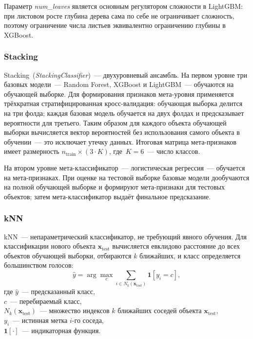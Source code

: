 Параметр \textit{num\_leaves} является основным регулятором сложности в LightGBM: при листовом росте глубина дерева сама по себе не ограничивает сложность, поэтому ограничение числа листьев эквивалентно ограничению глубины в XGBoost.

\subsubsection{Stacking}

Stacking~(\textit{StackingClassifier})~--- двухуровневый ансамбль. На первом уровне три базовых модели~--- Random Forest, XGBoost и LightGBM~--- обучаются на обучающей выборке. Для формирования признаков мета-уровня применяется трёхкратная стратифицированная кросс-валидация: обучающая выборка делится на три фолда; каждая базовая модель обучается на двух фолдах и предсказывает вероятности для третьего. Таким образом для каждого объекта обучающей выборки вычисляется вектор вероятностей без использования самого объекта в обучении~--- это исключает утечку данных. Итоговая матрица мета-признаков имеет размерность $n_{\text{train}} \times (3 \cdot K)$, где~$K = 6$~--- число классов.

На втором уровне мета-классификатор~--- логистическая регрессия~--- обучается на мета-признаках. При оценке на тестовой выборке базовые модели дообучаются на полной обучающей выборке и формируют мета-признаки для тестовых объектов; затем мета-классификатор выдаёт финальное предсказание.

\subsubsection{kNN}

kNN~--- непараметрический классификатор, не требующий явного обучения. Для классификации нового объекта $\mathbf{x}_{\text{test}}$ вычисляется евклидово расстояние до всех объектов обучающей выборки, отбираются $k$ ближайших, и класс определяется большинством голосов:
\begin{equation}\label{eq:knn_vote}
    \hat{y} = \arg\max_{c} \sum_{i \in N_k(\mathbf{x}_{\text{test}})} \mathbf{1}[y_i = c],
\end{equation}
где $\hat{y}$~--- предсказанный класс, \\ $c$~--- перебираемый класс, \\ $N_k(\mathbf{x}_{\text{test}})$~--- множество индексов $k$ ближайших соседей объекта $\mathbf{x}_{\text{test}}$, \\ $y_i$~--- истинная метка $i$-го соседа, \\ $\mathbf{1}[\cdot]$~--- индикаторная функция.

